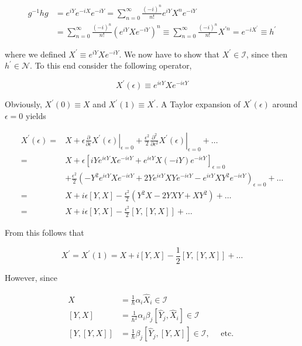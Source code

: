 \documentclass[10pt, letterpaper]{article}
\begin{document}
$$
\begin{aligned}
g^{-1} h g & =e^{i Y} e^{-i X} e^{-i Y}=\sum_{n=0}^{\infty} \frac{(-i)^{n}}{n!} e^{i Y} X^{n} e^{-i Y} \\
& =\sum_{n=0}^{\infty} \frac{(-i)^{n}}{n!}\left(e^{i Y} X e^{-i Y}\right)^{n} \equiv \sum_{n=0}^{\infty} \frac{(-i)^{n}}{n!} X^{\prime n}=e^{-i X^{\prime}} \equiv h^{\prime}
\end{aligned}
$$

where we defined $X^{\prime} \equiv e^{i Y} X e^{-i Y}$. We now have to show that $X^{\prime} \in \mathcal{I}$, since then $h^{\prime} \in \mathcal{N}$. To this end consider the following operator,

$$
X^{\prime}(\epsilon) \equiv e^{i \epsilon Y} X e^{-i \epsilon Y}
$$

Obviously, $X^{\prime}(0) \equiv X$ and $X^{\prime}(1) \equiv X^{\prime}$. A Taylor expansion of $X^{\prime}(\epsilon)$ around $\epsilon=0$ yields

$$
\begin{aligned}
X^{\prime}(\epsilon)= & X+\left.\epsilon \frac{\partial}{\partial \epsilon} X^{\prime}(\epsilon)\right|_{\epsilon=0}+\left.\frac{\epsilon^{2}}{2} \frac{\partial^{2}}{\partial \epsilon^{2}} X^{\prime}(\epsilon)\right|_{\epsilon=0}+\ldots \\
= & X+\epsilon\left[i Y e^{i \epsilon Y} X e^{-i \epsilon Y}+e^{i \epsilon Y} X(-i Y) e^{-i \epsilon Y}\right]_{\epsilon=0} \\
& +\frac{\epsilon^{2}}{2}\left(-Y^{2} e^{i \epsilon Y} X e^{-i \epsilon Y}+2 Y e^{i \epsilon Y} X Y e^{-i \epsilon Y}-e^{i \epsilon Y} X Y^{2} e^{-i \epsilon Y}\right)_{\epsilon=0}+\ldots \\
= & X+i \epsilon[Y, X]-\frac{\epsilon^{2}}{2}\left(Y^{2} X-2 Y X Y+X Y^{2}\right)+\ldots \\
= & X+i \epsilon[Y, X]-\frac{\epsilon^{2}}{2}[Y,[Y, X]]+\ldots
\end{aligned}
$$

From this follows that

$$
X^{\prime}=X^{\prime}(1)=X+i[Y, X]-\frac{1}{2}[Y,[Y, X]]+\ldots
$$

However, since

$$
\begin{aligned}
X & =\frac{1}{\hbar} \alpha_{i} \hat{X}_{i} \in \mathcal{I} \\
{[Y, X] } & =\frac{1}{\hbar^{2}} \alpha_{i} \beta_{j}\left[\hat{Y}_{j}, \hat{X}_{i}\right] \in \mathcal{I} \\
{[Y,[Y, X]] } & =\frac{1}{\hbar} \beta_{j}\left[\hat{Y}_{j},[Y, X]\right] \in \mathcal{I}, \quad \text { etc. }
\end{aligned}
$$
\end{document}
